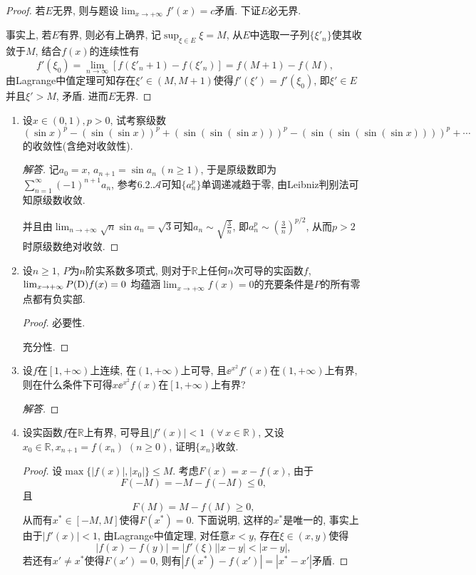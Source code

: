 \begin{2a}
\begin{enumerate}
\begin{proof}
若\(E\)无界, 则与题设\(\lim_{x\rightarrow+\infty}f'(x)=c\)矛盾. 下证\(E\)必无界. 

事实上, 若\(E\)有界, 则必有上确界, 记\(\sup_{\xi\in E}\xi =M\), 
从\(E\)中选取一子列\(\{\xi'_n\}\)使其收敛于\(M\), 结合\(f(x)\)的连续性有
\[f'(\xi_0)=\lim_{n\rightarrow\infty}\left[f(\xi'_n+1)-f(\xi'_n)\right]=f(M+1)-f(M),\]
由Lagrange中值定理可知存在\(\xi'\in(M,M+1)\)使得\(f'(\xi')=f'(\xi_0)\), 
即\(\xi'\in E\)并且\(\xi'>M\), 矛盾. 进而\(E\)无界.
\end{proof}
\end{enumerate}
\end{2a}
\begin{2b}
\begin{enumerate}
\item 设\(x\in(0,1),p>0\), 试考察级数
\[\left(\sin x\right)^p-\left(\sin\left(\sin x\right)\right)^p
+\left(\sin\left(\sin\left(\sin x\right)\right)\right)^p
-\left(\sin\left(\sin\left(\sin\left(\sin x\right)\right)\right)\right)^p+\cdots\]
的收敛性(含绝对收敛性).
\begin{proof}[解答]
记\(a_0=x\), \(a_{n+1}=\sin a_n\ (n\geqslant 1)\), 
于是原级数即为\(\sum_{n=1}^{\infty}(-1)^{n+1}a_n\), 
参考6.2.\(\boldsymbol{\mathcal{A}}\)可知\(\{a_n^p\}\)单调递减趋于零, 
由Leibniz判别法可知原级数收敛. 

并且由\(\lim_{n\rightarrow+\infty}\sqrt{n}\sin a_n=\sqrt{3}\)可知\(a_n\sim\sqrt{\frac{3}{n}}\), 
即\(a_n^p\sim\left(\frac{3}{n}\right)^{p/2}\), 从而\(p>2\)时原级数绝对收敛.
\end{proof}
\item 设\(n\geqslant 1\), \(P\)为\(n\)阶实系数多项式, 
则对于\(\mathbb{R}\)上任何\(n\)次可导的实函数\(f\), 
\(\lim_{x\rightarrow +\infty}P({\rm D})f(x)=0\)
均蕴涵\(\lim_{x\rightarrow+\infty}f(x)=0\)的充要条件是\(P\)的所有零点都有负实部.
\begin{proof}
	必要性.
    
    充分性.
\end{proof}
\item 设\(f\)在\(\left[1,+\infty\right)\)上连续, 在\(\left(1,+\infty\right)\)上可导, 
且\(\ee^{x^2}f'(x)\)在\(\left(1,+\infty\right)\)上有界, 
则在什么条件下可得\(x\ee^{x^2}f(x)\)在\(\left[1,+\infty\right)\)上有界?
\begin{proof}[解答]
	
\end{proof}
\item 设实函数\(f\)在\(\mathbb{R}\)上有界, 可导且\(|f'(x)|<1\) \((\forall\, x\in\mathbb{R})\), 
又设\(x_0\in\mathbb{R},x_{n+1}=f(x_n)\) \((n\geqslant 0)\), 证明\(\{x_n\}\)收敛.
\begin{proof}
设\(\max\{\left|f(x)\right|,|x_0|\}\leqslant M\). 
考虑\(F(x)=x-f(x)\), 由于\[F(-M)=-M-f(-M)\leqslant 0,\]
且\[F(M)=M-f(M)\geqslant 0,\]
从而有\(x^*\in[-M,M]\)使得\(F(x^*)=0\). 
下面说明, 这样的\(x^*\)是唯一的, 事实上由于\(|f'(x)|<1\), 
由Lagrange中值定理, 对任意\(x<y\), 存在\(\xi\in(x,y)\)使得
\[\left|f(x)-f(y)\right|=|f'(\xi)||x-y|<|x-y|,\]
若还有\(x'\ne x^*\)使得\(F(x')=0\), 则有\(|f(x^*)-f(x')|=|x^*-x'|\)矛盾.


\end{proof}
\end{enumerate}
\end{2b}
